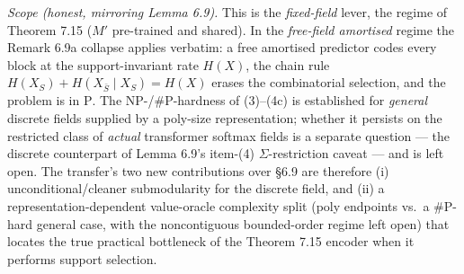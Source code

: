 \documentclass[
]{article}
\begin{document}
\emph{Scope (honest, mirroring Lemma 6.9).} This is the \emph{fixed-field}
lever, the regime of Theorem 7.15 ($M'$ pre-trained and shared). In the
\emph{free-field amortised} regime the Remark 6.9a collapse applies verbatim:
a free amortised predictor codes every block at the support-invariant rate
$H(X)$, the chain rule $H(X_S)+H(X_{\bar S}\mid X_S)=H(X)$ erases the
combinatorial selection, and the problem is in $\mathrm P$. The NP-/\#P-hardness
of (3)--(4c) is established for \emph{general} discrete fields supplied by a
poly-size representation; whether it persists on the restricted class of
\emph{actual} transformer softmax fields is a separate question --- the
discrete counterpart of Lemma 6.9's item-(4) $\Sigma$-restriction caveat ---
and is left open. The transfer's two new contributions over §6.9 are
therefore (i) unconditional/cleaner submodularity for the discrete field, and
(ii) a representation-dependent value-oracle complexity split (poly endpoints
vs.\ a \#P-hard general case, with the noncontiguous bounded-order regime left
open) that locates the true practical bottleneck of the Theorem 7.15 encoder
when it performs support selection.
\end{document}
